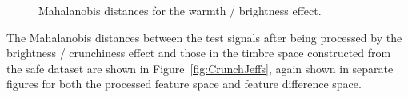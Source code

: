 			\begin{figure}[h!]
				\centering
				\quad
				\caption{Mahalanobis distances for the warmth / brightness effect.}
				\label{fig:HarshJeffs}
			\end{figure}

			The Mahalanobis distances between the test signals after being processed by the brightness /
			crunchiness effect and those in the timbre space constructed from the \acrshort{safe} dataset are
			shown in Figure~\ref{fig:CrunchJeffs}, again shown in separate figures for both the processed
			feature space and feature difference space.

